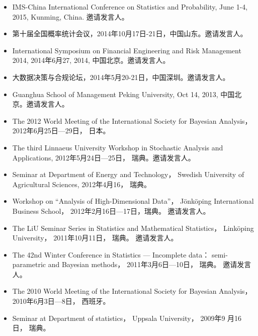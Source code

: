 \documentclass[twoside,a4paper,11pt]{article}
\begin{document}
\begin{itemize}
\item IMS-China International Conference on Statistics and Probability, June 1-4, 2015,
  Kunming, China. 邀请发言人。

\item 第十届全国概率统计会议，2014年10月17日-21日，中国山东。邀请发言人。

\item International Symposium on Financial Engineering and Risk Management 2014, 2014年6月27,
  2014, 中国北京。邀请发言人。

\item 大数据决策与合规论坛，2014年5月20-21日，中国深圳。邀请发言人。

\item Guanghua School of Management Peking University, Oct 14, 2013, 中国北京。邀请发言人。

\item The 2012 World Meeting of the International Society for Bayesian
  Analysis， 2012年6月25日---29日， 日本。

\item The third Linnaeus University Workshop in Stochastic Analysis and
  Applications, 2012年5月24日---25日， 瑞典。邀请发言人。

\item Seminar at Department of Energy and Technology， Swedish
  University of Agricultural Sciences, 2012年4月16， 瑞典。

\item Workshop on ``Analysis of High-Dimensional Data''，
  Jönköping International Business School， 2012年2月16日---17日，瑞典。
  邀请发言人。

\item The LiU Seminar Series in Statistics and Mathematical Statistics，
  Linköping University， 2011年10月11日， 瑞典。 邀请发言人。

\item The 42nd Winter Conference in Statistics --- Incomplete data：
  semi-parametric and Bayesian methods， 2011年3月6日---10日，
  瑞典。 邀请发言人。

\item The 2010 World Meeting of the International Society for Bayesian
  Analysis， 2010年6月3日---8日， 西班牙。

\item Seminar at Department of statistics， Uppsala University， 2009年9
  月16日， 瑞典。

\end{itemize}
\end{document}
